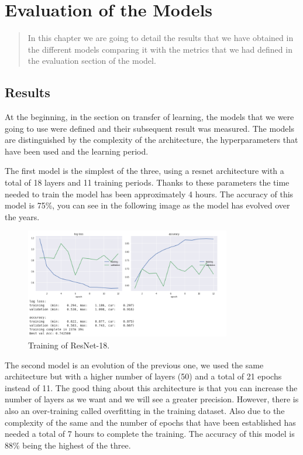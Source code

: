 \chapter{Evaluation of the Models}

\begin{abstract}
In this chapter we are going to detail the results that we have obtained in the different models comparing it with the metrics that we had defined in the evaluation section of the model.
\end{abstract}


\section{Results}

At the beginning, in the section on transfer of learning, the models that we were going to use were defined and their subsequent result was measured. The models are distinguished by the complexity of the architecture, the hyperparameters that have been used and the learning period. 

The first model is the simplest of the three, using a resnet architecture with a total of 18 layers and 11 training periods. Thanks to these parameters the time needed to train the model has been approximately 4 hours.
The accuracy of this model is 75\%, you can see in the following image as the model has evolved over the years.


\begin{figure}[H]
\centering
\includegraphics[width=0.8\textwidth]{./figures/resnet-18}
\caption{Training of ResNet-18.}
\end{figure}


The second model is an evolution of the previous one, we used the same architecture but with a higher number of layers (50) and a total of 21 epochs instead of 11. The good thing about this architecture is that you can increase the number of layers as we want and we will see a greater precision. However, there is also an over-training called overfitting in the training dataset. Also due to the complexity of the same and the number of epochs that have been established has needed a total of 7 hours to complete the training. The accuracy of this model is 88\% being the highest of the three.


